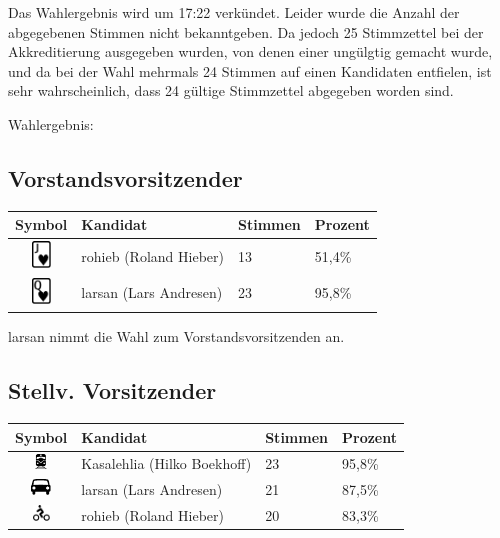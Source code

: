 \documentclass[a4paper,12pt]{scrartcl}
\begin{document}
Das Wahlergebnis wird um 17:22 verkündet. Leider wurde die Anzahl der
abgegebenen Stimmen nicht bekanntgeben. Da jedoch 25 Stimmzettel bei der
Akkreditierung ausgegeben wurden, von denen einer ungülgtig gemacht wurde, und
da bei der Wahl mehrmals 24 Stimmen auf einen Kandidaten entfielen, ist sehr
wahrscheinlich, dass 24 gültige Stimmzettel abgegeben worden sind.

Wahlergebnis:

\subsection*{Vorstandsvorsitzender}
\begin{tabular}{|c|l|l|l|}
  \hline
  \textbf{Symbol} & \textbf{Kandidat} & \textbf{Stimmen} & \textbf{Prozent} \\
  \hline
  \includegraphics[height=20pt]{images/mv20151206-wahl-1v-1.pdf} &
  rohieb (Roland Hieber) & 13 & 51{,}4\% \\
  \includegraphics[height=20pt]{images/mv20151206-wahl-1v-2.pdf} &
  larsan (Lars Andresen) & 23 & 95{,}8\% \\
  \hline
\end{tabular}

larsan nimmt die Wahl zum Vorstandsvorsitzenden an.

\subsection*{Stellv. Vorsitzender}
\begin{tabular}{|c|l|l|l|}
  \hline
  \textbf{Symbol} & \textbf{Kandidat} & \textbf{Stimmen} & \textbf{Prozent} \\
  \hline
  \includegraphics[height=12pt]{images/mv20151206-wahl-2v-1.pdf} &
  Kasalehlia (Hilko Boekhoff)  & 23 & 95{,}8\% \\
  \includegraphics[height=12pt]{images/mv20151206-wahl-2v-2.pdf} &
  larsan (Lars Andresen)       & 21 & 87{,}5\% \\
  \includegraphics[height=12pt]{images/mv20151206-wahl-2v-3.pdf} &
  rohieb (Roland Hieber)       & 20 & 83{,}3\% \\
  \hline
\end{tabular}
\end{document}
